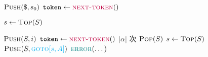 
\begin{algorithm}[H]
\begin{algorithmic}[1]
    \State $\Call{Push}{\$, s_{0}}$ 
    \State $\token \gets \Call{\purple{next-token}}{\null}$

    \hStatex
      \State $s \gets \Call{Top}{S}$

      \hStatex
       
        \State $\Call{Push}{S, i}$ 
        \State $\token \gets \Call{\purple{next-token}}{\null}$
       
        \State $|\alpha|$ 次 $\Call{Pop}{S}$
        \State $s \gets \Call{Top}{S}$
        \State $\Call{Push}{S, \cyan{\goto[s, A]}}$ 
       
      \Else
        \State $\Call{\teal{error}}{\dots}$
      \EndIf
    \EndWhile
  \EndProcedure
\end{algorithmic}
\end{algorithm}